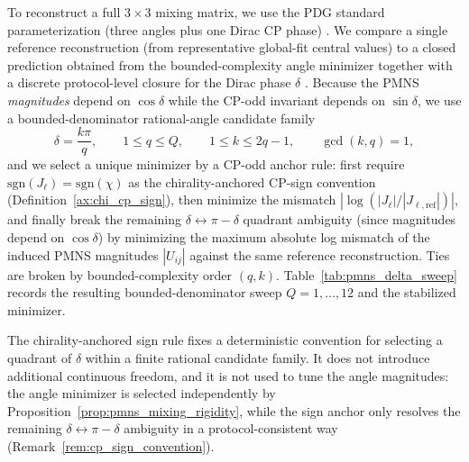To reconstruct a full $3\times 3$ mixing matrix, we use the PDG standard parameterization (three angles plus one Dirac CP phase) \cite{PDGRPP2024}.
We compare a single reference reconstruction (from representative global-fit central values) to a closed prediction obtained from the bounded-complexity angle minimizer together with a discrete protocol-level closure for the Dirac phase $\delta$ \cite{Esteban2020NuFIT}.
Because the PMNS \emph{magnitudes} depend on $\cos\delta$ while the CP-odd invariant depends on $\sin\delta$, we use a bounded-denominator rational-angle candidate family
\[
\delta=\frac{k\pi}{q},\qquad 1\le q\le Q,
\qquad 1\le k\le 2q-1,\qquad \gcd(k,q)=1,
\]
and we select a unique minimizer by a CP-odd anchor rule:
first require $\mathrm{sgn}(J_\ell)=\mathrm{sgn}(\chi)$ as the chirality-anchored CP-sign convention (Definition~\ref{ax:chi_cp_sign}), then minimize the mismatch $|\log(|J_\ell|/|J_{\ell,\mathrm{ref}}|)|$, and finally break the remaining $\delta\leftrightarrow \pi-\delta$ quadrant ambiguity (since magnitudes depend on $\cos\delta$) by minimizing the maximum absolute log mismatch of the induced PMNS magnitudes $|U_{ij}|$ against the same reference reconstruction.
Ties are broken by bounded-complexity order $(q,k)$.
Table~\ref{tab:pmns_delta_sweep} records the resulting bounded-denominator sweep $Q=1,\dots,12$ and the stabilized minimizer.
\begin{remark}\label{rem:pmns_cp_sign_status}
The chirality-anchored sign rule fixes a deterministic convention for selecting a quadrant of $\delta$ within a finite rational candidate family.
It does not introduce additional continuous freedom, and it is not used to tune the angle magnitudes: the angle minimizer is selected independently by Proposition~\ref{prop:pmns_mixing_rigidity}, while the sign anchor only resolves the remaining $\delta\leftrightarrow \pi-\delta$ ambiguity in a protocol-consistent way (Remark~\ref{rem:cp_sign_convention}).
\end{remark}

\begin{table}[t]
\centering
\small
\setlength{\tabcolsep}{10pt}
\renewcommand{\arraystretch}{1.15}
%
\caption{Bounded-denominator closure for the PMNS Dirac phase $\delta$ using a chirality-anchored CP-sign convention (Definition~\ref{ax:chi_cp_sign}) and a deterministic bounded-complexity tie-break. Here $E_{\infty}(|U|):=\max_{i,j}|\log(|U_{ij}|_{\mathrm{closed}}/|U_{ij}|_{\mathrm{ref}})||$ is the max abs.\ log mismatch of the induced PMNS magnitudes against the reference reconstruction. Rows are generated by \texttt{scripts/exp\_pmns\_matrix\_closure.py}.}
\label{tab:pmns_delta_sweep}
\end{table}


